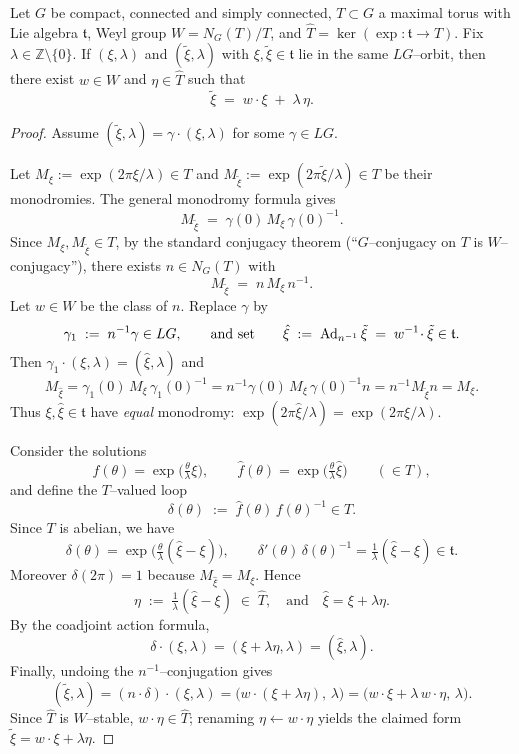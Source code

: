 \documentclass[12pt]{article}
\begin{document}
\begin{lemma}
Let $G$ be compact, connected and simply connected, $T\subset G$ a maximal
torus with Lie algebra $\mathfrak t$, Weyl group $W=N_G(T)/T$, and
$\widehat T=\ker(\exp:\mathfrak t\to T)$. Fix $\lambda\in\mathbb Z\setminus\{0\}$.
If $(\xi,\lambda)$ and $(\tilde\xi,\lambda)$ with $\xi,\tilde\xi\in\mathfrak t$
lie in the same $LG$–orbit, then there exist $w\in W$ and $\eta\in\widehat T$
such that
\[
\tilde\xi \;=\; w\!\cdot\xi \;+\; \lambda\,\eta.
\]
\end{lemma}

\begin{proof}
Assume $(\tilde\xi,\lambda)=\gamma\cdot(\xi,\lambda)$ for some $\gamma\in LG$.

Let $M_\xi:=\exp(2\pi\xi/\lambda)\in T$ and $M_{\tilde\xi}:=\exp(2\pi\tilde\xi/\lambda)\in T$
be their monodromies. The general monodromy formula gives
\[
M_{\tilde\xi} \;=\; \gamma(0)\,M_\xi\,\gamma(0)^{-1}.
\]
Since $M_\xi,M_{\tilde\xi}\in T$, by the standard conjugacy theorem
(“$G$–conjugacy on $T$ is $W$–conjugacy”), there exists $n\in N_G(T)$ with
\[
M_{\tilde\xi} \;=\; n\,M_\xi\,n^{-1}.
\]
Let $w\in W$ be the class of $n$. Replace $\gamma$ by
\[
\gamma_1 \;:=\; n^{-1}\gamma \in LG,
\qquad
\text{and set}\qquad
\hat\xi \;:=\; \operatorname{Ad}_{n^{-1}}\tilde\xi \;=\; w^{-1}\!\cdot\tilde\xi \in \mathfrak t.
\]
Then $\gamma_1\cdot(\xi,\lambda)=(\hat\xi,\lambda)$ and
\[
M_{\hat\xi}
= \gamma_1(0)\,M_\xi\,\gamma_1(0)^{-1}
= n^{-1}\gamma(0)\,M_\xi\,\gamma(0)^{-1}n
= n^{-1}M_{\tilde\xi}n
= M_\xi.
\]
Thus $\xi,\hat\xi\in\mathfrak t$ have \emph{equal} monodromy:
$\exp(2\pi\hat\xi/\lambda)=\exp(2\pi\xi/\lambda)$.

Consider the solutions
\[
f(\theta)=\exp\!\Big(\tfrac{\theta}{\lambda}\xi\Big),\qquad
\hat f(\theta)=\exp\!\Big(\tfrac{\theta}{\lambda}\hat\xi\Big)\qquad(\in T),
\]
and define the $T$–valued loop
\[
\delta(\theta)\;:=\;\hat f(\theta)\,f(\theta)^{-1}\in T.
\]
Since $T$ is abelian, we have
\[
\delta(\theta)=\exp\!\Big(\tfrac{\theta}{\lambda}(\hat\xi-\xi)\Big),
\qquad
\delta'(\theta)\,\delta(\theta)^{-1}=\tfrac{1}{\lambda}(\hat\xi-\xi)\in\mathfrak t.
\]
Moreover $\delta(2\pi)=1$ because $M_{\hat\xi}=M_\xi$. Hence
\[
\eta\;:=\;\tfrac{1}{\lambda}(\hat\xi-\xi)\;\in\;\widehat T,
\quad\text{and}\quad
\hat\xi=\xi+\lambda\eta.
\]
By the coadjoint action formula,
\[
\delta\cdot(\xi,\lambda)=(\xi+\lambda\eta,\lambda)=(\hat\xi,\lambda).
\]
Finally, undoing the $n^{-1}$–conjugation gives
\[
(\tilde\xi,\lambda)
=(n\cdot\delta)\cdot(\xi,\lambda)
=\Big(w\!\cdot(\xi+\lambda\eta),\,\lambda\Big)
=\Big(w\!\cdot\xi+\lambda\,w\!\cdot\eta,\,\lambda\Big).
\]
Since $\widehat T$ is $W$–stable, $w\!\cdot\eta\in\widehat T$; renaming
$\eta\leftarrow w\!\cdot\eta$ yields the claimed form
$\tilde\xi=w\!\cdot\xi+\lambda\eta$.
\end{proof}
\end{document}
